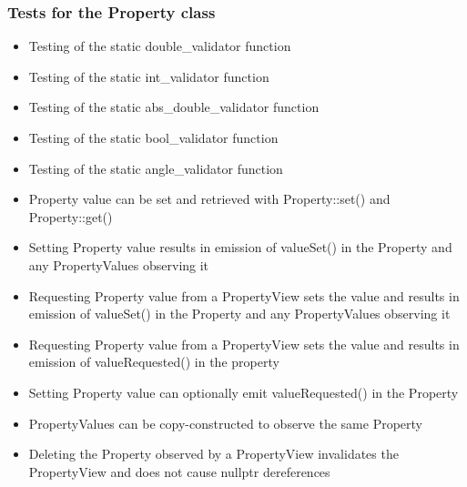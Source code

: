 \subsubsection*{Tests for the Property class}
\begin{itemize}
    \item Testing of the static double\_validator function
    \item Testing of the static int\_validator function
    \item Testing of the static abs\_double\_validator function
    \item Testing of the static bool\_validator function
    \item Testing of the static angle\_validator function
    \item Property value can be set and retrieved with Property::set() and Property::get()
    \item Setting Property value results in emission of valueSet() in the Property and any PropertyValues observing it
    \item Requesting Property value from a PropertyView sets the value and results in emission of valueSet() in the Property and any PropertyValues observing it
    \item Requesting Property value from a PropertyView sets the value and results in emission of valueRequested() in the property
    \item Setting Property value can optionally emit valueRequested() in the Property
    \item PropertyValues can be copy-constructed to observe the same Property
    \item Deleting the Property observed by a PropertyView invalidates the PropertyView and does not cause nullptr dereferences
\end{itemize}